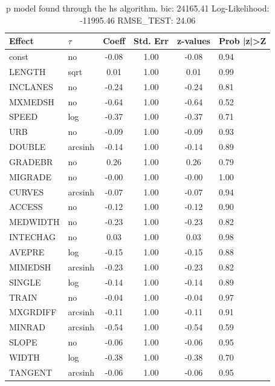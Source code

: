 \begin{table}
	\caption{p model found through the hs algorithm. bic: 24165.41 Log-Likelihood: -11995.46 RMSE_TEST: 24.06}
	\begin{center}
		\begin{tabular}{|l|l|c|c|c|l|}
			\hline
			Effect & $\tau$ & Coeff & Std. Err & z-values & Prob |z|>Z \\
			\hline
			const & no & -0.08 & 1.00 & -0.08 & 0.94 \\
			\hline
			LENGTH & sqrt & 0.01 & 1.00 & 0.01 & 0.99 \\
			\hline
			INCLANES & no & -0.24 & 1.00 & -0.24 & 0.81 \\
			\hline
			MXMEDSH & no & -0.64 & 1.00 & -0.64 & 0.52 \\
			\hline
			SPEED & log & -0.37 & 1.00 & -0.37 & 0.71 \\
			\hline
			URB & no & -0.09 & 1.00 & -0.09 & 0.93 \\
			\hline
			DOUBLE & arcsinh & -0.14 & 1.00 & -0.14 & 0.89 \\
			\hline
			GRADEBR & no & 0.26 & 1.00 & 0.26 & 0.79 \\
			\hline
			MIGRADE & no & -0.00 & 1.00 & -0.00 & 1.00 \\
			\hline
			CURVES & arcsinh & -0.07 & 1.00 & -0.07 & 0.94 \\
			\hline
			ACCESS & no & -0.12 & 1.00 & -0.12 & 0.90 \\
			\hline
			MEDWIDTH & no & -0.23 & 1.00 & -0.23 & 0.82 \\
			\hline
			INTECHAG & no & 0.03 & 1.00 & 0.03 & 0.98 \\
			\hline
			AVEPRE & log & -0.15 & 1.00 & -0.15 & 0.88 \\
			\hline
			MIMEDSH & arcsinh & -0.23 & 1.00 & -0.23 & 0.82 \\
			\hline
			SINGLE & log & -0.14 & 1.00 & -0.14 & 0.89 \\
			\hline
			TRAIN & no & -0.04 & 1.00 & -0.04 & 0.97 \\
			\hline
			MXGRDIFF & arcsinh & -0.11 & 1.00 & -0.11 & 0.91 \\
			\hline
			MINRAD & arcsinh & -0.54 & 1.00 & -0.54 & 0.59 \\
			\hline
			SLOPE & no & -0.06 & 1.00 & -0.06 & 0.95 \\
			\hline
			WIDTH & log & -0.38 & 1.00 & -0.38 & 0.70 \\
			\hline
			TANGENT & arcsinh & -0.06 & 1.00 & -0.06 & 0.95 \\
			\hline

\end{tabular}
\end{center}
\end{table}
